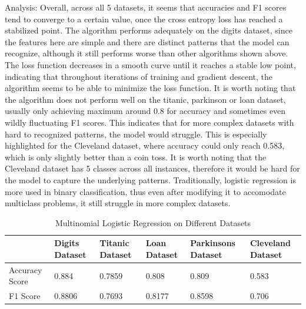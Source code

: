 \documentclass[letterpaper]{article}
\begin{document}
Analysis: Overall, across all 5 datasets, it seems that accuracies and F1 scores tend to converge to a certain value, once the cross entropy loss has reached a stabilized point.
The algorithm performs adequately on the digits dataset, since the features here are simple and there are distinct patterns that the model can recognize, although it still performs worse than other algorithms shown above.
The loss function decreases in a smooth curve until it reaches a stable low point, indicating that throughout iterations of training and gradient descent, the algorithm seems to be able to minimize the loss function.
It is worth noting that the algorithm does not perform well on the titanic, parkinson or loan dataset, usually only achieving maximum around 0.8 for accuracy and sometimes even wildly fluctuating F1 scores. This indicates that for more complex datasets with hard to recognized patterns, the model would struggle.
This is especially highlighted for the Cleveland dataset, where accuracy could only reach 0.583, which is only slightly better than a coin toss.
It is worth noting that the Cleveland dataset has 5 classes across all instances, therefore it would be hard for the model to capture the underlying patterns. Traditionally, logistic regression is more used in binary classification, thus even after modifying it to accomodate multiclass problems, it still struggle in more complex datasets.
\begin{table}[H]
	\centering
	\begin{tabular}{|l|l|l|l|l|l|}
		\hline
		               & Digits Dataset & Titanic Dataset & Loan Dataset & Parkinsons Dataset & Cleveland Dataset \\ \hline
		Accuracy Score & 0.884          & 0.7859          & 0.808        & 0.809              & 0.583             \\ \hline
		F1 Score       & 0.8806         & 0.7693          & 0.8177       & 0.8598             & 0.706             \\ \hline
	\end{tabular}
	\caption{Multinomial Logistic Regression on Different Datasets}
\end{table}
\end{document}
